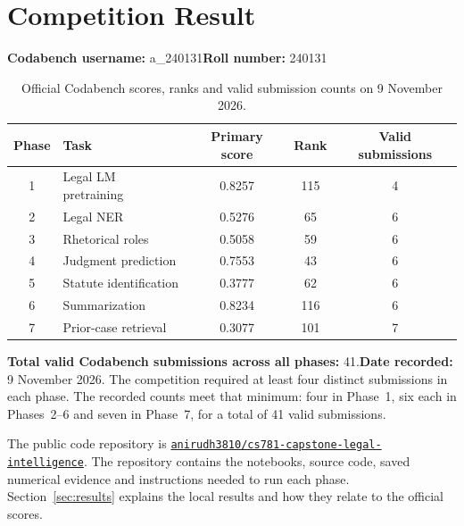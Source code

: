 \begin{abstract}
This project explores how far a small, self-hosted legal NLP system can go under limited GPU compute. It covers seven tasks, from text continuation and entity extraction to summarization and prior-case retrieval. Four foundation models, with 52.2--82.0 million parameters, were trained from scratch on the official legal corpus and then adapted to the downstream tasks. The experiments compare full and partial tuning with low-rank methods, adapters, prompts and distillation. The main findings concern exact span boundaries, long-document coverage and the reliability of validation scores. Summarization reached an audit BERTScore F1 of 0.82624, while retrieval reached tuning micro F1@7 of 0.34367. Several more complex methods failed to improve on simpler alternatives. The report separates local measurements from official competition results and documents how training was resumed after interruptions.
\end{abstract}

\section{Competition Result}
\noindent\textbf{Codabench username:} a\_240131\hfill\textbf{Roll number:} 240131

\begin{table}[H]
\centering\small
\caption{Official Codabench scores, ranks and valid submission counts on 9 November 2026.}
\label{tab:leaderboard}
\begin{tabular}{clccc}
\toprule
Phase & Task & Primary score & Rank & Valid submissions\\
\midrule
1 & Legal LM pretraining & 0.8257 & 115 & 4\\
2 & Legal NER & 0.5276 & 65 & 6\\
3 & Rhetorical roles & 0.5058 & 59 & 6\\
4 & Judgment prediction & 0.7553 & 43 & 6\\
5 & Statute identification & 0.3777 & 62 & 6\\
6 & Summarization & 0.8234 & 116 & 6\\
7 & Prior-case retrieval & 0.3077 & 101 & 7\\
\bottomrule
\end{tabular}
\end{table}

\noindent\textbf{Total valid Codabench submissions across all phases:} 41.\quad\textbf{Date recorded:} 9 November 2026.
\medskip
The competition required at least four distinct submissions in each phase. The recorded counts meet that minimum: four in Phase~1, six each in Phases~2--6 and seven in Phase~7, for a total of 41 valid submissions.

The public code repository is
\href{https://github.com/anirudh3810/cs781-capstone-legal-intelligence}{\texttt{anirudh3810/cs781-capstone-legal-intelligence}}.
The repository contains the notebooks, source code, saved numerical evidence and instructions needed to run each phase. Section~\ref{sec:results} explains the local results and how they relate to the official scores.
